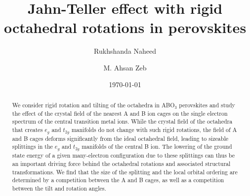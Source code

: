 \documentclass[a4paper,prb]{revtex4-1}  %
\newcommand{\com}[1]{}
\begin{document}
\title{Jahn-Teller effect with rigid octahedral rotations in perovskites} %


\author{Rukhshanda Naheed}

\author{M. Ahsan Zeb}

\date{\today}
\begin{abstract}

\com{INTRO:
The octahedral rotations and tilting in ABO$_3$ perovskites
are usually explained in terms of 
the relative sizes 
of the three types of ions involved.
}

We consider
rigid rotation and tilting of the 
octahedra
 in ABO$_3$ perovskites
and study the
effect of the crystal field of the nearest A and B ion cages 
on the single electron spectrum of the 
central 
transition metal ions.
While the crystal field of the octahedra 
that 
creates $e_g$ and $t_{2g}$ manifolds
do not change with such rigid rotations, 
the field of 
A and B cages
deforms significantly %
from the ideal octahedral field,
leading to sizeable splittings in the $e_g$ and $t_{2g}$ manifolds of the central B ion.
The lowering of the ground state energy
of a given many-electron configuration
due to these splittings
can thus be an important driving force behind the octahedral rotations 
and associated structural transformations.
We find that the size of the splitting and the local orbital ordering are
determined by a competition between the A and B cages, 
as well as a competition between the tilt and rotation angles.

\com{
SUM:
While B and tilting tend to bring $xy,x^2-y^2$ down in energy,
A and rotations do the opposite.
}





\com{

Rigid octahedral rotations in a perovskite structure 
deform the crystal field ... from the symmetric octahedral ...

AB ions: cubic and octahedral cages....
O ions: octahedral cage....
Cubic structure: octahedral fields of AB and O are aligned... oriented 
Tilting and rotation of the O octahedra.... change their relative orientation....
and the the combined field is no more octahedral but has a lower symmetry. 
AB lattice: V: -10 to 17 percent of V of O lattice....
So... it is a strong perturbation to the octahedral field... and couples eg and t2g manifolds... and in lifts their degeneracies.... 
}



\end{abstract}
\end{document}
